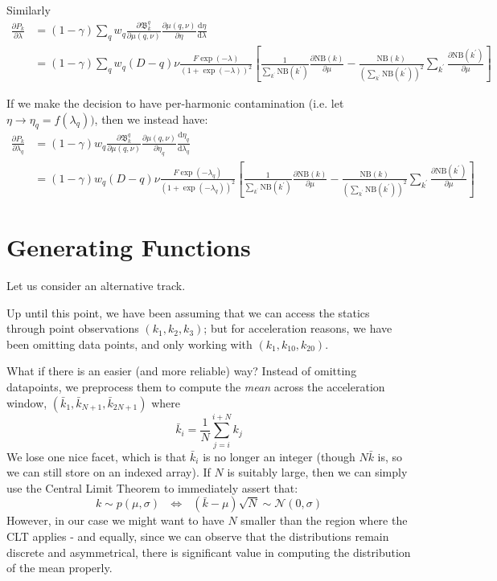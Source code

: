 \documentclass[fleqn,usenatbib]{acmart}
\renewcommand{\d}{\mathrm d}
\renewcommand{\div}[2]{\frac{\d #1}{\d #2} }
\newcommand{\pdiv}[2]{\frac{\partial #1}{\partial #2}}
\begin{document}
				Similarly
				\begin{align*}
					\pdiv{P_k}{\lambda} & = (1-\gamma) \sum_q w_q \pdiv{\mathfrak{B}_k^q}{\mu(q,\nu)} \pdiv{\mu(q,\nu)}{\eta}\div{\eta}{\lambda}
					\\
					& = (1-\gamma) \sum_q w_q (D-q)\nu \frac{F\exp(-\lambda)}{(1 + \exp(-\lambda))^2}\left[ \frac{1}{\sum_{k^\prime} \text{NB}(k^\prime)}  \pdiv{\text{NB}(k)}{\mu} - \frac{\text{NB}(k)}{\left(\sum_{k^\prime} \text{NB}(k^\prime)\right)^2}  \sum_{k^\prime} \pdiv{\text{NB}(k^\prime)}{\mu}\right]
				\end{align*}

				If we make the decision to have per-harmonic contamination (i.e. let $\eta \to \eta_q = f(\lambda_q))$, then we instead have:
				\begin{align*}
					\pdiv{P_k}{\lambda_q} & = (1-\gamma) w_q \pdiv{\mathfrak{B}_k^q}{\mu(q,\nu)} \pdiv{\mu(q,\nu)}{\eta_q}\div{\eta_q}{\lambda_q}
					\\
					& =  (1-\gamma) w_q (D-q)\nu \frac{F\exp(-\lambda_q)}{(1 + \exp(-\lambda_q))^2}\left[ \frac{1}{\sum_{k^\prime} \text{NB}(k^\prime)}  \pdiv{\text{NB}(k)}{\mu} - \frac{\text{NB}(k)}{\left(\sum_{k^\prime} \text{NB}(k^\prime)\right)^2}  \sum_{k^\prime} \pdiv{\text{NB}(k^\prime)}{\mu}\right]
				\end{align*}


	\section{Generating Functions}

		Let us consider an alternative track.   

		Up until this point, we have been assuming that we can access the statics through point observations $(k_1,k_2,k_3)$; but for acceleration reasons, we have been omitting data points, and only working with $(k_1,k_{10},k_{20})$.

		What if there is an easier (and more reliable) way? Instead of omitting datapoints, we preprocess them to compute the \textit{mean} across the acceleration window, $(\bar{k}_1, \bar{k}_{N+1},\bar{k}_{2N+1})$ where 
		\begin{equation}
			\bar{k}_i = \frac{1}{N}\sum_{j=i}^{i+N} k_j
		\end{equation}
		We lose one nice facet, which is that $\bar{k}_i$ is no longer an integer (though $N\bar{k}$ is, so we can still store on an indexed array). If $N$ is suitably large, then we can simply use the Central Limit Theorem to immediately assert that:
		\begin{equation}
			k\sim p(\mu,\sigma) ~~~ \Longleftrightarrow~~~ (\bar{k} - \mu)\sqrt{N} \sim \mathcal{N}(0,\sigma)
		\end{equation}
		However, in our case we might want to have $N$ smaller than the region where the CLT applies - and equally, since we can observe that the distributions remain discrete and asymmetrical, there is significant value in computing the distribution of the mean properly. 
\end{document}
